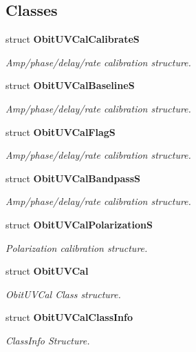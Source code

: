 \subsection*{Classes}
\begin{CompactItemize}
\item 
struct {\bf Obit\-UVCal\-Calibrate\-S}
\begin{CompactList}\small\item\em Amp/phase/delay/rate calibration structure. \item\end{CompactList}\item 
struct {\bf Obit\-UVCal\-Baseline\-S}
\begin{CompactList}\small\item\em Amp/phase/delay/rate calibration structure. \item\end{CompactList}\item 
struct {\bf Obit\-UVCal\-Flag\-S}
\begin{CompactList}\small\item\em Amp/phase/delay/rate calibration structure. \item\end{CompactList}\item 
struct {\bf Obit\-UVCal\-Bandpass\-S}
\begin{CompactList}\small\item\em Amp/phase/delay/rate calibration structure. \item\end{CompactList}\item 
struct {\bf Obit\-UVCal\-Polarization\-S}
\begin{CompactList}\small\item\em Polarization calibration structure. \item\end{CompactList}\item 
struct {\bf Obit\-UVCal}
\begin{CompactList}\small\item\em Obit\-UVCal Class structure. \item\end{CompactList}\item 
struct {\bf Obit\-UVCal\-Class\-Info}
\begin{CompactList}\small\item\em Class\-Info Structure. \item\end{CompactList}\end{CompactItemize}

